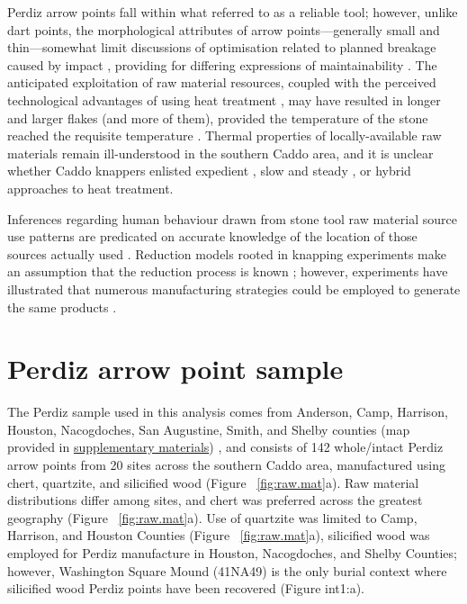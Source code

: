 \documentclass[review]{elsarticle}
\begin{document}
Perdiz arrow points fall within what \citet[738-741]{RN5873} referred to as a reliable tool; however, unlike dart points, the morphological attributes of arrow points—generally small and thin—somewhat limit discussions of optimisation related to planned breakage caused by impact \citep{RN6170,RN7045}, providing for differing expressions of maintainability \citep{RN5789}. The anticipated exploitation of raw material resources, coupled with the perceived technological advantages of using heat treatment \citep{RN6171}, may have resulted in longer and larger flakes (and more of them), provided the temperature of the stone reached the requisite temperature \citep{RN5900}. Thermal properties of locally-available raw materials remain ill-understood in the southern Caddo area, and it is unclear whether Caddo knappers enlisted expedient \citep{RN8970,RN6201}, slow and steady \citep{RN8971}, or hybrid approaches to heat treatment.

Inferences regarding human behaviour drawn from stone tool raw material source use patterns are predicated on accurate knowledge of the location of those sources actually used \citep[365]{RN5787}. Reduction models rooted in knapping experiments make an assumption that the reduction process is known \citep{RN6855}; however, experiments have illustrated that numerous manufacturing strategies could be employed to generate the same products \citep{RN8968,RN8969}. 

\section*{Perdiz arrow point sample}

The Perdiz sample used in this analysis comes from Anderson, Camp, Harrison, Houston, Nacogdoches, San Augustine, Smith, and Shelby counties (map provided in \href{https://aksel-blaise.github.io/perdiz/spatial.html}{supplementary materials}) \citep{RN8980}, and consists of 142 whole/intact Perdiz arrow points from 20 sites across the southern Caddo area, manufactured using chert, quartzite, and silicified wood (Figure ~\ref{fig:raw.mat}a). Raw material distributions differ among sites, and chert was preferred across the greatest geography (Figure ~\ref{fig:raw.mat}a). Use of quartzite was limited to Camp, Harrison, and Houston Counties (Figure ~\ref{fig:raw.mat}a), silicified wood was employed for Perdiz manufacture in Houston, Nacogdoches, and Shelby Counties; however, Washington Square Mound (41NA49) is the only burial context where silicified wood Perdiz points have been recovered (Figure int1:a). 
\end{document}
